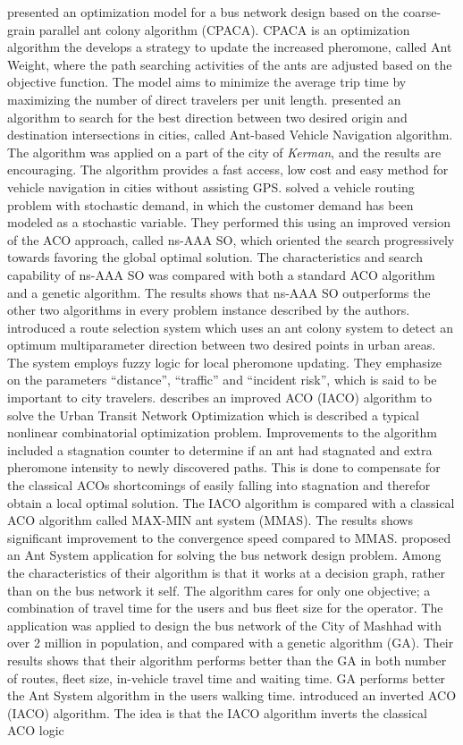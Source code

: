 \citet{yang07} presented an optimization model for a bus network design based on the coarse-grain parallel ant colony algorithm (CPACA). CPACA is an optimization algorithm the develops a strategy to update the increased pheromone, called Ant Weight, where the path searching activities of the ants are adjusted based on the objective function. The model aims to minimize the average trip time by maximizing the number of direct travelers per unit length. \citet{salehi-nezhad07} presented an algorithm to search for the best direction between two desired origin and destination intersections in cities, called Ant-based Vehicle Navigation algorithm. The algorithm was applied on a part of the city of \textit{Kerman}, and the results are encouraging. The algorithm provides a fast access, low cost and easy method for vehicle navigation in cities without assisting GPS.\citet{tripathi09} solved a vehicle routing problem with stochastic demand, in which the customer demand has been modeled as a stochastic variable. They performed this using an improved version of the ACO approach, called ns-AAA SO, which oriented the search progressively towards favoring the global optimal solution. The characteristics and search capability of ns-AAA SO was compared with both a standard ACO algorithm and a genetic algorithm. The results shows that ns-AAA SO outperforms the other two algorithms in every problem instance described by the authors. \citet{salehinejad10} introduced a route selection system which uses an ant colony system to detect an optimum multiparameter direction between two desired points in urban areas. The system employs fuzzy logic for local pheromone updating. They emphasize on the parameters ``distance'', ``traffic'' and ``incident risk'', which is said to be important to city travelers. \citet{jiang10} describes an improved ACO (IACO) algorithm to solve the Urban Transit Network Optimization which is described a typical nonlinear combinatorial optimization problem. Improvements to the algorithm included a stagnation counter to determine if an ant had stagnated and extra pheromone intensity to newly discovered paths. This is done to compensate for the classical ACOs shortcomings of easily falling into stagnation and therefor obtain a local optimal solution. The IACO algorithm is compared with a classical ACO algorithm called MAX-MIN ant system (MMAS)\citep{stutzle99}. The results shows significant improvement to the convergence speed compared to MMAS.\citet{poorzahedy11} proposed an Ant System application for solving the bus network design problem. Among the characteristics of their algorithm is that it works at a decision graph, rather than on the bus network it self. The algorithm cares for only one objective; a combination of travel time for the users and bus fleet size for the operator. The application was applied to design the bus network of the City of Mashhad with over 2 million in population, and compared with a genetic algorithm (GA). Their results shows that their algorithm performs better than the GA in both number of routes, fleet size, in-vehicle travel time and waiting time. GA performs better the Ant System algorithm in the users walking time. \citet{dias14} introduced an inverted ACO (IACO) algorithm. The idea is that the IACO algorithm inverts the classical ACO logic 
